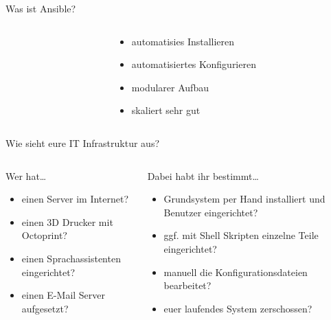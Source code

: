 \documentclass[aspectratio=169]{beamer}
\begin{document}
\begin{frame}{Was ist Ansible?}
\begin{columns}
\begin{column}{0.2\textwidth}
        \end{column}
        \begin{column}{0.4\textwidth}
            \begin{itemize}
                \item automatisies Installieren
                \item automatisiertes Konfigurieren
                \item modularer Aufbau
                \item skaliert sehr gut
            \end{itemize}
        \end{column}
    \end{columns}
\end{frame}


\begin{frame}{Wie sieht eure IT Infrastruktur aus?}
    \begin{columns}
        \begin{column}{0.5\textwidth}
            Wer hat\ldots
                \begin{itemize}
                    \item einen Server im Internet?
                    \item einen 3D Drucker mit Octoprint?
                    \item einen Sprachassistenten eingerichtet?
                    \item einen E-Mail Server aufgesetzt? 
                \end{itemize}
        \end{column}
        \pause
        \begin{column}{0.5\textwidth}
             Dabei habt ihr bestimmt\ldots
                \begin{itemize}
                    \item Grundsystem per Hand installiert und Benutzer eingerichtet?
                    \item ggf. mit Shell Skripten einzelne Teile eingerichtet?
                    \item manuell die Konfigurationsdateien bearbeitet?
                    \item euer laufendes System zerschossen?
                \end{itemize}
        \end{column}
    \end{columns}
\end{frame}
\end{document}
